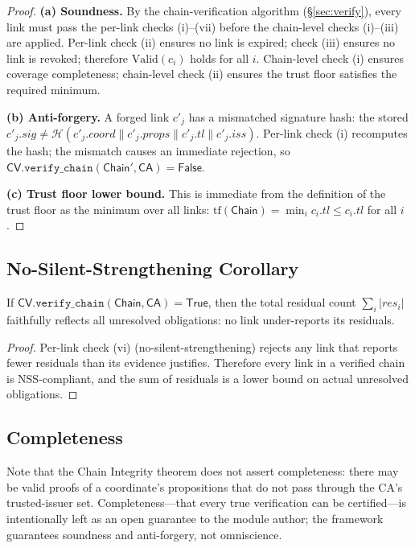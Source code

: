 \documentclass[11pt]{article}
\newcommand{\Chain}{\mathsf{Chain}}            %
\newcommand{\CA}{\mathsf{CA}}                  %
\newcommand{\CV}{\mathsf{CV}}                  %
\newcommand{\certcoord}{\mathit{coord}}        %
\newcommand{\certprops}{\mathit{props}}        %
\newcommand{\certtrust}{\mathit{tl}}           %
\newcommand{\certissuer}{\mathit{iss}}         %
\newcommand{\certsig}{\mathit{sig}}            %
\newcommand{\certresid}{\mathit{res}}          %
\newcommand{\Valid}{\mathrm{Valid}}            %
\newcommand{\Sigalg}{\mathcal{H}}              %
\begin{document}
\begin{proof}
\textbf{(a) Soundness.}
By the chain-verification algorithm (\S\ref{sec:verify}), every link
must pass the per-link checks (i)--(vii) before the chain-level checks
(i)--(iii) are applied.
Per-link check (ii) ensures no link is expired; check (iii) ensures no
link is revoked; therefore $\Valid(c_i)$ holds for all $i$.
Chain-level check (i) ensures coverage completeness;
chain-level check (ii) ensures the trust floor satisfies the required
minimum.

\textbf{(b) Anti-forgery.}
A forged link $c'_j$ has a mismatched signature hash: the stored
$c'_j.\certsig \ne \Sigalg(c'_j.\certcoord \| c'_j.\certprops \| c'_j.\certtrust \| c'_j.\certissuer)$.
Per-link check (i) recomputes the hash; the mismatch causes an
immediate rejection, so $\CV.\texttt{verify\_chain}(\Chain', \CA) = \mathsf{False}$.

\textbf{(c) Trust floor lower bound.}
This is immediate from the definition of the trust floor as the minimum
over all links: $\mathrm{tf}(\Chain) = \min_i c_i.\certtrust \le c_i.\certtrust$
for all $i$.
\end{proof}

\subsection{No-Silent-Strengthening Corollary}

\begin{corollary}\label{cor:nss}
If $\CV.\texttt{verify\_chain}(\Chain, \CA) = \mathsf{True}$, then
the total residual count $\sum_i |\certresid_i|$ faithfully reflects
all unresolved obligations: no link under-reports its residuals.
\end{corollary}
\begin{proof}
Per-link check (vi) (no-silent-strengthening) rejects any link that
reports fewer residuals than its evidence justifies.
Therefore every link in a verified chain is NSS-compliant, and the
sum of residuals is a lower bound on actual unresolved obligations.
\end{proof}

\subsection{Completeness}

Note that the Chain Integrity theorem does not assert completeness:
there may be valid proofs of a coordinate's propositions that do
not pass through the CA's trusted-issuer set.
Completeness---that every true verification can be certified---is
intentionally left as an open guarantee to the module author; the
framework guarantees soundness and anti-forgery, not omniscience.
\end{document}
